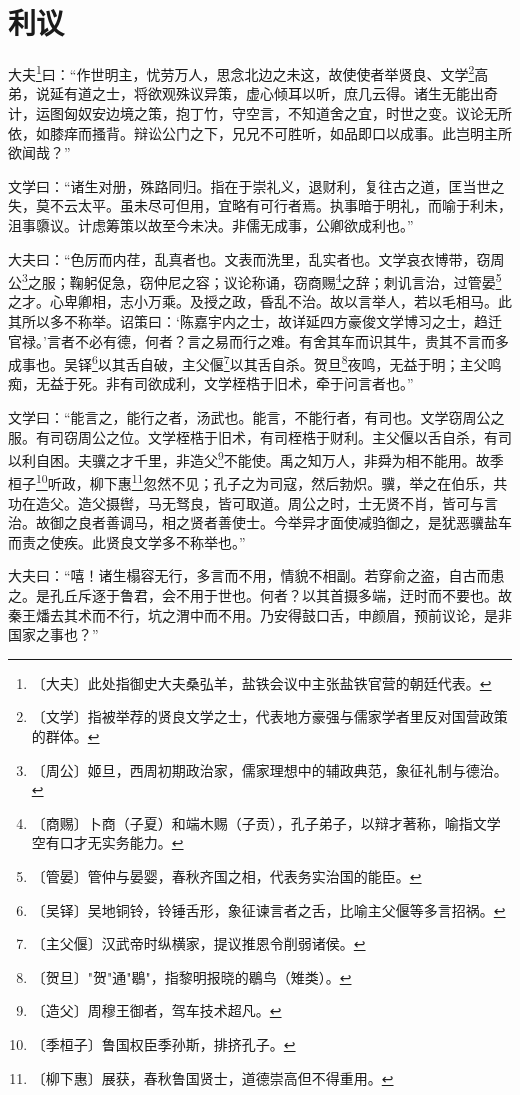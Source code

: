 \documentclass[12pt,UTF-8,openany,a4]{ctexbook}
\begin{document}
\chapter{利议}

\begin{large}
    
    大夫\footnote{〔大夫〕\yiwen 此处指御史大夫桑弘羊，盐铁会议中主张盐铁官营的朝廷代表。}曰：“作世明主，忧劳万人，思念北边之未这，故使使者举贤良、文学\footnote{〔文学〕\yiwen 指被举荐的贤良文学之士，代表地方豪强与儒家学者里反对国营政策的群体。}高弟，说延有道之士，将欲观殊议异策，虚心倾耳以听，庶几云得。诸生无能出奇计，运图匈奴安边境之策，抱丁竹，守空言，不知道舍之宜，时世之变。议论无所依，如膝痒而搔背。辩讼公门之下，兄兄不可胜听，如品即口以成事。此岂明主所欲闻哉？”
    
    文学曰：“诸生对册，殊路同归。指在于崇礼义，退财利，复往古之道，匡当世之失，莫不云太平。虽未尽可但用，宜略有可行者焉。执事暗于明礼，而喻于利未，沮事隳议。计虑筹策以故至今未决。非儒无成事，公卿欲成利也。”
    
    大夫曰：“色厉而内荏，乱真者也。文表而洗里，乱实者也。文学哀衣博带，窃周公\footnote{〔周公〕\yiwen 姬旦，西周初期政治家，儒家理想中的辅政典范，象征礼制与德治。}之服；鞠躬促急，窃仲尼之容；议论称诵，窃商赐\footnote{〔商赐〕\yiwen 卜商（子夏）和端木赐（子贡），孔子弟子，以辩才著称，喻指文学空有口才无实务能力。}之辞；刺讥言治，过管晏\footnote{〔管晏〕\yiwen 管仲与晏婴，春秋齐国之相，代表务实治国的能臣。}之才。心卑卿相，志小万乘。及授之政，昏乱不治。故以言举人，若以毛相马。此其所以多不称举。诏策曰：‘陈嘉宇内之士，故详延四方豪俊文学博习之士，趋迁官禄。’言者不必有德，何者？言之易而行之难。有舍其车而识其牛，贵其不言而多成事也。吴铎\footnote{〔吴铎〕\yiwen 吴地铜铃，铃锤舌形，象征谏言者之舌，比喻主父偃等多言招祸。}以其舌自破，主父偃\footnote{〔主父偃〕\yiwen 汉武帝时纵横家，提议推恩令削弱诸侯。}以其舌自杀。贺旦\footnote{〔贺旦〕\yiwen "贺"通"鶡"，指黎明报晓的鶡鸟（雉类）。}夜鸣，无益于明；主父鸣痴，无益于死。非有司欲成利，文学桎梏于旧术，牵于问言者也。”
    
    文学曰：“能言之，能行之者，汤武也。能言，不能行者，有司也。文学窃周公之服。有司窃周公之位。文学桎梏于旧术，有司桎梏于财利。主父偃以舌自杀，有司以利自困。夫骥之才千里，非造父\footnote{〔造父〕\yiwen 周穆王御者，驾车技术超凡。}不能使。禹之知万人，非舜为相不能用。故季桓子\footnote{〔季桓子〕\yiwen 鲁国权臣季孙斯，排挤孔子。}听政，柳下惠\footnote{〔柳下惠〕\yiwen 展获，春秋鲁国贤士，道德崇高但不得重用。}忽然不见；孔子之为司寇，然后勃炽。骥，举之在伯乐，共功在造父。造父摄辔，马无驽良，皆可取道。周公之时，士无贤不肖，皆可与言治。故御之良者善调马，相之贤者善使士。今举异才面使减驺御之，是犹恶骥盐车而责之使疾。此贤良文学多不称举也。”
    
    大夫曰：“嘻！诸生榻容无行，多言而不用，情貌不相副。若穿俞之盗，自古而患之。是孔丘斥逐于鲁君，会不用于世也。何者？以其首摄多端，迂时而不要也。故秦王燔去其术而不行，坑之渭中而不用。乃安得鼓口舌，申颜眉，预前议论，是非国家之事也？”

\end{large}
\end{document}
